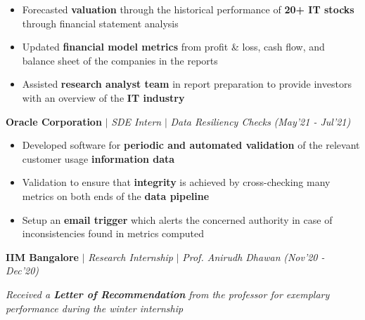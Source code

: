 \documentclass[10pt]{article}
\begin{document}
    \begin{itemize}[label={\textbullet},itemsep = -1 mm, leftmargin=*]
        
        \item Forecasted \textbf{valuation} through the historical performance of \textbf{20+ IT stocks} through financial statement analysis
        \item Updated \textbf{financial model metrics} from profit \& loss, cash flow, and balance sheet of the companies in the reports
        \item Assisted \textbf{research analyst team} in report preparation to provide investors with an overview of the \textbf{IT industry}
    \end{itemize}
\vspace{-6pt}
\textbf{Oracle Corporation} \textbf{$|$} {\textit{SDE Intern} \textbf{$|$} \textit{Data Resiliency Checks}} \hfill{\sl \small (May'21 - Jul'21)}  	\\
    \vspace{-0.3cm}
    \hline
    \vspace{-3pt}

    \begin{itemize}[label={\textbullet},itemsep = -1 mm, leftmargin=*]
        \item Developed software for \textbf{periodic and automated validation} of the relevant customer usage \textbf{information data}
        \item Validation to ensure that \textbf{integrity} is achieved by cross-checking many metrics on both ends of the \textbf{data pipeline}
        \item Setup an \textbf{email trigger} which alerts the concerned authority in case of inconsistencies found in metrics computed
    
    \end{itemize}
\vspace{-6pt}
\textbf{IIM Bangalore} $|$ \textit{Research Internship} $|$ \textit{Prof. Anirudh Dhawan} \hfill{\sl \small (Nov'20 - Dec’20)}  \\
  \vspace{-0.3cm}
 \hline 
 \vspace{-3pt}
 \begin{flushleft}
\textit{Received a \textbf{Letter of Recommendation} from the professor for exemplary performance during the winter internship}
 \end{flushleft}
\end{document}
